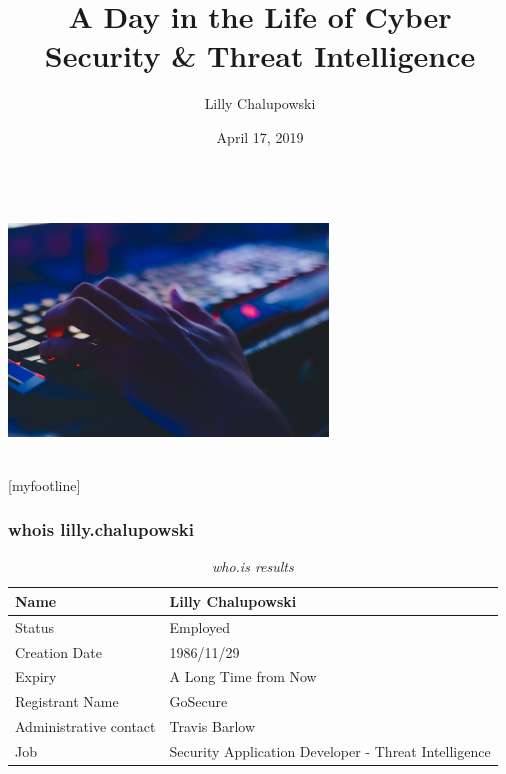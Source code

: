 \documentclass[aspectratio=169]{beamer}
\title{A Day in the Life of Cyber Security \& Threat Intelligence}
\institute{GoSecure}
\author{Lilly Chalupowski}
\date{April 17, 2019}
\begin{document}
\begin{frame}[t]
  \begin{center}
    \begingroup
    \fontsize{20pt}{20pt}\selectfont
    \inserttitle \\
    \endgroup
    \includegraphics[width=8.5cm,keepaspectratio]{hacker} \\
    \insertauthor \\
    \insertdate
  \end{center}
\end{frame}

[myfootline]

\begin{frame}
  \frametitle{whois lilly.chalupowski}
  \begin{table}
    \caption{\textit{who.is results}}
    \begin{tabularx}{\textwidth}{|X|X|}
      \hline
      Name & Lilly Chalupowski \\
      \hline
      Status & Employed \\
      \hline
      Creation Date & 1986/11/29 \\
      \hline
      Expiry & A Long Time from Now \\
      \hline
      Registrant Name & GoSecure \\
      \hline
      Administrative contact & Travis Barlow \\
      \hline
      Job & Security Application Developer - Threat Intelligence \\
      \hline
    \end{tabularx}
  \end{table}
\end{frame}
\end{document}
